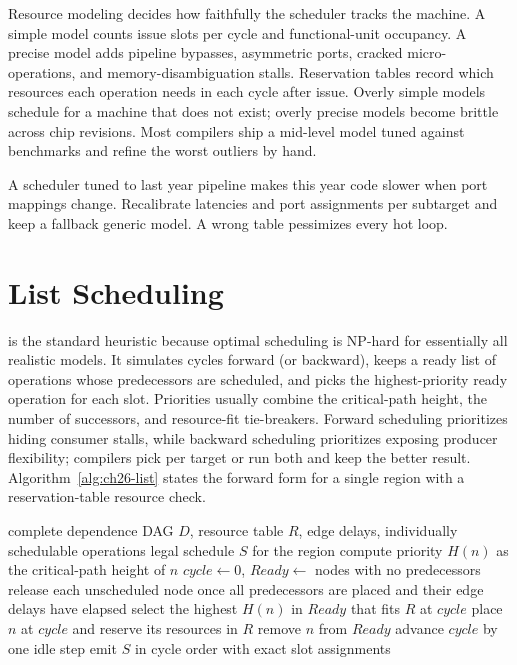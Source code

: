 Resource modeling decides how faithfully the scheduler tracks the machine.
A simple model counts issue slots per cycle and functional-unit occupancy.
A precise model adds pipeline bypasses, asymmetric ports, cracked micro-operations, and memory-disambiguation stalls.
Reservation tables record which resources each operation needs in each cycle after issue.
Overly simple models schedule for a machine that does not exist; overly precise models become brittle across chip revisions.
Most compilers ship a mid-level model tuned against benchmarks and refine the worst outliers by hand.
\begin{ccnote}
A scheduler tuned to last year pipeline makes this year code slower when port mappings change.
Recalibrate latencies and port assignments per subtarget and keep a fallback generic model.
A wrong table pessimizes every hot loop.
\end{ccnote}

\section{List Scheduling}\label{sec:ch26-algorithm}

 is the standard heuristic because optimal scheduling is NP-hard for essentially all realistic models.
It simulates cycles forward (or backward), keeps a ready list of operations whose predecessors are scheduled, and picks the highest-priority ready operation for each slot.
Priorities usually combine the critical-path height, the number of successors, and resource-fit tie-breakers.
Forward scheduling prioritizes hiding consumer stalls, while backward scheduling prioritizes exposing producer flexibility; compilers pick per target or run both and keep the better result.
Algorithm~\ref{alg:ch26-list} states the forward form for a single region with a reservation-table resource check.

\begin{algorithm}[htbp]
\caption{Forward list scheduling for one region}\label{alg:ch26-list}
\begin{pseudocode}
\Require complete dependence DAG $D$, resource table $R$, edge delays, individually schedulable operations
\Ensure legal schedule $S$ for the region
\State compute priority $H(n)$ as the critical-path height of $n$
\State $cycle \gets 0$, $Ready \gets$ nodes with no predecessors
\State release each unscheduled node once all predecessors are placed and their edge delays have elapsed
\State select the highest $H(n)$ in $Ready$ that fits $R$ at $cycle$
\State place $n$ at $cycle$ and reserve its resources in $R$
\State remove $n$ from $Ready$
\Else
\State advance $cycle$ by one idle step
\EndIf
\EndWhile
\State emit $S$ in cycle order with exact slot assignments
\end{pseudocode}
\end{algorithm}

